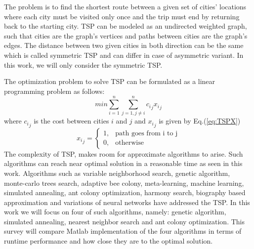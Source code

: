 \documentclass[twocolumn]{article}
\begin{document}
	The problem is to find the shortest route between a given set of cities' locations where each city must be visited only once and the trip must end by returning back to the starting city. TSP can be modeled as an undirected weighted graph, such that cities are the graph's vertices and paths between cities are the graph's edges. The distance between two given cities in both direction can be the same which is called symmetric TSP and can differ in case of asymmetric variant. In this work, we will only consider the symmetric TSP.

	The optimization problem to solve TSP can be formulated as a linear programming problem as follows\cite{papadimitriou98}:
	\begin{equation} \label{eq:TSPLinearProgramming}
	min \sum_{i=1}^{n} \sum_{j=1, j\neq i}^{n} {c_i}_j {x_i}_j
	\end{equation}
	where ${c_i}_j$ is the cost between cities $i$ and $j$ and ${x_i}_j$ is given by Eq.(\ref{eq:TSPX})
	\begin{equation} \label{eq:TSPX}
	{x_i}_j = 
	\begin{cases}
	1,& \text{path goes from i to j}\\
	0,& \text{otherwise}
	\end{cases}
	\end{equation}
	The complexity of TSP, makes room for approximate algorithms to arise\cite{Brucal17}. Such algorithms can reach near optimal solution in a reasonable time as seen in this work. Algorithms such as variable neighborhood search\cite{Thanh15}, genetic algorithm\cite{Wang17}, monte-carlo trees search\cite{Perez14}, adaptive bee colony\cite{Rekaby13}, meta-learning\cite{Kanda11}, machine learning\cite{Pihera14}, simulated annealing\cite{Kerrache14}, ant colony optimization\cite{Swiatnicki15}, harmony search\cite{Tongchan17}, biography based approximation\cite{Wu17} and variations of neural networks\cite{Gao10}\cite{Mueller15} have addressed the TSP. In this work we will focus on four of such algorithms, namely: genetic algorithm\cite{Kirk14}\cite{mathwork}, simulated annealing\cite{Jang02}, nearest neighbor search\cite{Jevtic14} and ant colony optimization\cite{Ibrahim15}. This survey will compare {Matlab\texttrademark}  implementation of the four algorithms in terms of runtime performance and how close they are to the optimal solution.
	
\end{document}
